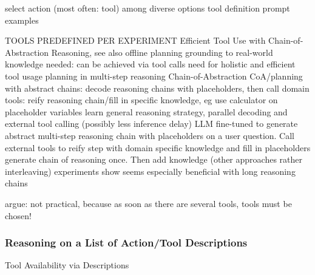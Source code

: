 \documentclass{article}
\begin{document}
select action (most often: tool) among diverse options
tool definition prompt examples

TOOLS PREDEFINED PER EXPERIMENT
\cite{gao_efficient_2024} Efficient Tool Use with Chain-of-Abstraction Reasoning, see also offline planning
grounding to real-world knowledge needed: can be achieved via tool calls
need for holistic and efficient tool usage planning in multi-step reasoning
Chain-of-Abstraction CoA/planning with abstract chains: decode reasoning chains with placeholders, then call domain tools: reify reasoning chain/fill in specific knowledge, eg use calculator on placeholder variables
learn general reasoning strategy, parallel decoding and external tool calling (possibly less inference delay)
LLM fine-tuned to generate abstract multi-step reasoning chain with placeholders on a user question. Call external tools to reify step with domain specific knowledge and fill in placeholders
generate chain of reasoning once. Then add knowledge (other approaches rather interleaving)
experiments show seems especially beneficial with long reasoning chains

argue: not practical, because as soon as there are several tools, tools must be chosen!

\subsubsection{Reasoning on a List of Action/Tool Descriptions}
Tool Availability via Descriptions
\end{document}
